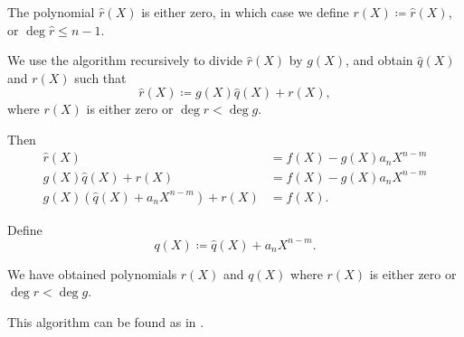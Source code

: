 \begin{algorithm}
\begin{thmenum}
    The polynomial \( \hat r(X) \) is either zero, in which case we define \( r(X) \coloneqq \hat r(X) \), or \( \deg \hat r \leq n - 1 \).

    We use the algorithm recursively to divide \( \hat r(X) \) by \( g(X) \), and obtain \( \hat q(X) \) and \( r(X) \) such that
    \begin{equation*}
      \hat r(X) \coloneqq g(X) \hat q(X) + r(X),
    \end{equation*}
    where \( r(X) \) is either zero or \( \deg r < \deg g \).

    Then
    \begin{align*}
      \hat r(X)                                         &= f(X) - g(X) a_n X^{n-m} \\
      g(X) \hat q(X) + r(X)                             &= f(X) - g(X) a_n X^{n-m} \\
      g(X) \left(\hat q(X) + a_n X^{n-m} \right) + r(X) &= f(X).
    \end{align*}

    Define
    \begin{equation*}
      q(X) \coloneqq \hat q(X) + a_n X^{n-m}.
    \end{equation*}

    We have obtained polynomials \( r(X) \) and \( q(X) \) where \( r(X) \) is either zero or \( \deg r < \deg g \).
  \end{thmenum}
\end{algorithm}
\begin{comments}
  \item This algorithm can be found as  in \cite{notebook:code}.
\end{comments}

